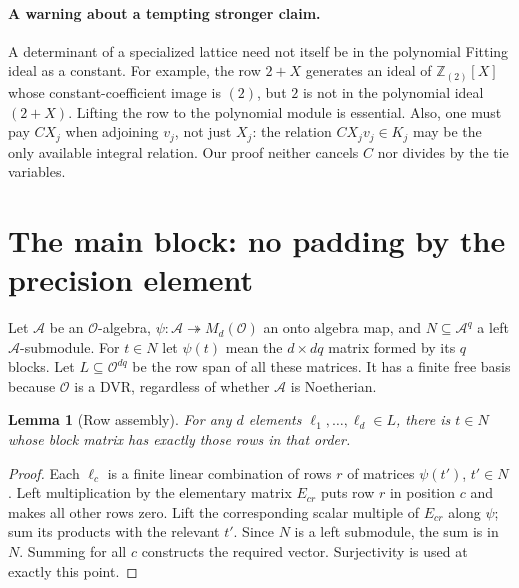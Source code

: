\documentclass[11pt]{article}
\newtheorem{lemma}[theorem]{Lemma}
\newcommand{\Ocal}{\mathcal O}
\begin{document}
\paragraph{A warning about a tempting stronger claim.} A determinant of a specialized lattice need not itself be in the polynomial Fitting ideal as a constant. For example, the row $2+X$ generates an ideal of $\mathbb Z_{(2)}[X]$ whose constant-coefficient image is $(2)$, but $2$ is not in the polynomial ideal $(2+X)$. Lifting the row to the polynomial module is essential. Also, one must pay $C X_j$ when adjoining $v_j$, not just $X_j$: the relation $CX_jv_j\in K_j$ may be the only available integral relation. Our proof neither cancels $C$ nor divides by the tie variables.

\section{The main block: no padding by the precision element}\label{sec:block}
Let $\mathcal A$ be an $\Ocal$-algebra, $\psi:\mathcal A\twoheadrightarrow M_d(\Ocal)$ an onto algebra map, and $N\subseteq\mathcal A^q$ a left $\mathcal A$-submodule. For $t\in N$ let $\psi(t)$ mean the $d\times dq$ matrix formed by its $q$ blocks. Let $L\subseteq\Ocal^{dq}$ be the row span of all these matrices. It has a finite free basis because $\Ocal$ is a DVR, regardless of whether $\mathcal A$ is Noetherian.

\begin{lemma}[Row assembly]\label{lem:assembly}
For any $d$ elements $\ell_1,\ldots,\ell_d\in L$, there is $t\in N$ whose block matrix has exactly those rows in that order.
\end{lemma}
\begin{proof}
Each $\ell_c$ is a finite linear combination of rows $r$ of matrices $\psi(t')$, $t'\in N$. Left multiplication by the elementary matrix $E_{cr}$ puts row $r$ in position $c$ and makes all other rows zero. Lift the corresponding scalar multiple of $E_{cr}$ along $\psi$; sum its products with the relevant $t'$. Since $N$ is a left submodule, the sum is in $N$. Summing for all $c$ constructs the required vector. Surjectivity is used at exactly this point.
\end{proof}
\end{document}
